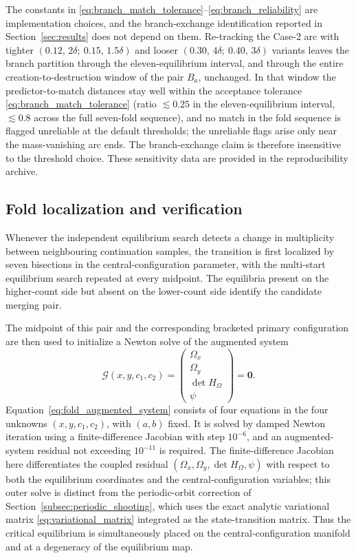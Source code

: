 The constants in \eqref{eq:branch_match_tolerance}--\eqref{eq:branch_reliability}
are implementation choices, and the branch-exchange identification reported in
Section~\ref{sec:results} does not depend on them. Re-tracking the Case-2 arc
with tighter $(0.12,\,2\delta;\ 0.15,\,1.5\delta)$ and looser
$(0.30,\,4\delta;\ 0.40,\,3\delta)$ variants leaves the branch partition through
the eleven-equilibrium interval, and through the entire creation-to-destruction
window of the pair $B_a$, unchanged. In that window the predictor-to-match
distances stay well within the acceptance tolerance
\eqref{eq:branch_match_tolerance} (ratio $\lesssim0.25$ in the eleven-equilibrium
interval, $\lesssim0.8$ across the full seven-fold sequence), and no match in the
fold sequence is flagged unreliable at the default thresholds; the unreliable
flags arise only near the mass-vanishing arc ends. The branch-exchange claim is
therefore insensitive to the threshold choice. These sensitivity data are
provided in the reproducibility archive.


\subsection{Fold localization and verification}
\label{subsec:foldmethods}

Whenever the independent equilibrium search detects a change in
multiplicity between neighbouring continuation samples, the transition is
first localized by seven bisections in the central-configuration parameter,
with the multi-start equilibrium search repeated at every midpoint. The
equilibria present on the higher-count side but absent on the lower-count
side identify the candidate merging pair.

The midpoint of this pair and the corresponding bracketed primary
configuration are then used to initialize a Newton solve of the augmented
system
\begin{equation}
\mathcal G(x,y,c_1,c_2)
=
\begin{pmatrix}
\Omega_x\\
\Omega_y\\
\det H_\Omega\\
\psi
\end{pmatrix}
=
\mathbf 0.
\label{eq:fold_augmented_system}
\end{equation}
Equation~\eqref{eq:fold_augmented_system} consists of four equations in the
four unknowns $(x,y,c_1,c_2)$, with $(a,b)$ fixed. It is solved by damped
Newton iteration using a finite-difference Jacobian with step $10^{-6}$,
and an augmented-system residual not exceeding $10^{-11}$ is required. The
finite-difference Jacobian here differentiates the coupled residual
$(\Omega_x,\Omega_y,\det H_\Omega,\psi)$ with respect to both the equilibrium
coordinates and the central-configuration variables; this outer solve is
distinct from the periodic-orbit correction of
Section~\ref{subsec:periodic_shooting}, which uses the exact analytic
variational matrix \eqref{eq:variational_matrix} integrated as the
state-transition matrix.
Thus the critical equilibrium is simultaneously placed on the
central-configuration manifold and at a degeneracy of the equilibrium map.

